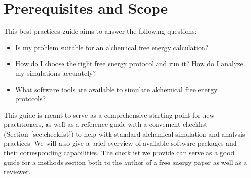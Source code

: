 \documentclass[9pt,bestpractices]{livecoms}
\begin{document}

\section{Prerequisites and Scope}
\label{sec:pre}


This best practices guide aims to answer the following questions:
\begin{itemize}
    \item Is my problem suitable for an alchemical free energy calculation? 
    \item How do I choose the right free energy protocol and run it? How do I analyze my simulations accurately? 
    \item What software tools are available to simulate alchemical free energy protocols? 
\end{itemize}
This guide is meant to serve as a comprehensive starting point for new practitioners, as well as a reference guide with a convenient checklist (Section~\ref{sec:checklist}) to help with standard alchemical simulation and analysis practices. 
We will also give a brief overview of available software packages and their corresponding capabilities.
The checklist we provide can serve as a good guide for a methods section both to the author of a free energy paper as well as a reviewer. 
\end{document}

